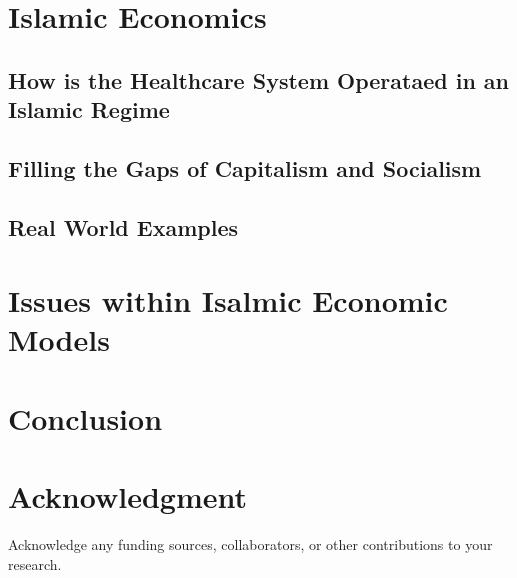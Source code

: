 \documentclass[conference]{IEEEtran}
\begin{document}
\section{Islamic Economics}


\subsection{How is the Healthcare System Operataed in an Islamic Regime}


\subsection{Filling the Gaps of Capitalism and Socialism}


\subsection{Real World Examples}


\section{Issues within Isalmic Economic Models}


\section{Conclusion}


\section*{Acknowledgment}
Acknowledge any funding sources, collaborators, or other contributions to your research.



\end{document}
